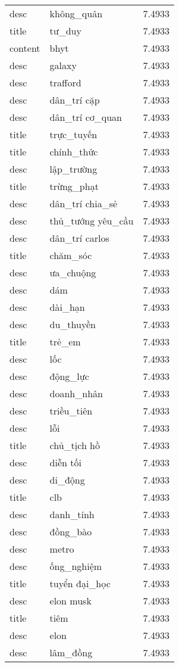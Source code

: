 \documentclass{article}
\begin{document}
\begin{tabular}{lll}
desc & không\_quân & 7.4933\\
title & tư\_duy & 7.4933\\
content & bhyt & 7.4933\\
desc & galaxy & 7.4933\\
desc & trafford & 7.4933\\
desc & dân\_trí cặp & 7.4933\\
desc & dân\_trí cơ\_quan & 7.4933\\
title & trực\_tuyến & 7.4933\\
title & chính\_thức & 7.4933\\
desc & lập\_trường & 7.4933\\
title & trừng\_phạt & 7.4933\\
desc & dân\_trí chia\_sẻ & 7.4933\\
desc & thủ\_tướng yêu\_cầu & 7.4933\\
desc & dân\_trí carlos & 7.4933\\
title & chăm\_sóc & 7.4933\\
desc & ưa\_chuộng & 7.4933\\
desc & dám & 7.4933\\
desc & dài\_hạn & 7.4933\\
desc & du\_thuyền & 7.4933\\
title & trẻ\_em & 7.4933\\
desc & lốc & 7.4933\\
desc & động\_lực & 7.4933\\
desc & doanh\_nhân & 7.4933\\
desc & triều\_tiên & 7.4933\\
desc & lỗi & 7.4933\\
title & chủ\_tịch hồ & 7.4933\\
desc & diễn tối & 7.4933\\
desc & di\_động & 7.4933\\
title & clb & 7.4933\\
desc & danh\_tính & 7.4933\\
desc & đồng\_bào & 7.4933\\
desc & metro & 7.4933\\
desc & ống\_nghiệm & 7.4933\\
title & tuyển đại\_học & 7.4933\\
desc & elon musk & 7.4933\\
title & tiêm & 7.4933\\
desc & elon & 7.4933\\
desc & lâm\_đồng & 7.4933\\

\end{tabular}
\end{document}
